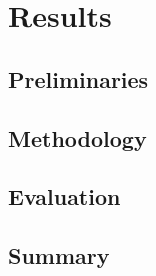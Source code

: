 
\chapter{Results}
\label{ch:results}
\vspace{2em}

\lipsum[1-4]

\section{Preliminaries}

\lipsum[5-8]

\section{Methodology}
 
\lipsum[9-15]

\section{Evaluation}

\lipsum[16-20]

\section{Summary}

\lipsum[21]
